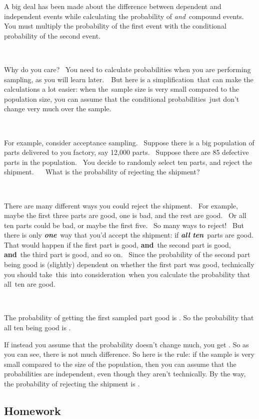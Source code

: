 \documentclass[]{book}
\begin{document}
A big deal has been made about the difference between dependent and
independent events while calculating the probability of \emph{and}~compound
events.~ You must multiply the probability of the first event with the
conditional probability of the second event.

~

Why do you care? ~You need to calculate probabilities when you are
performing sampling, as you will learn later.~~But here is a
simplification~that can make the calculations a lot easier: when
the~sample size is very small compared to the population size, you can
assume that the conditional probabilities~just don't change very much
over the sample.

~

For example, consider acceptance sampling. ~Suppose there is a big
population of parts delivered to you factory, say 12,000 parts. ~Suppose
there are 85 defective parts in the population. ~You decide to randomly
select ten parts, and reject the shipment. ~ ~What is the probability of
rejecting the shipment? ~

~

There are many different ways you could reject the shipment. ~For
example, maybe the first three parts are good, one is bad, and the rest
are good. ~Or all ten parts could be bad, or maybe the first five. ~So
many ways to reject! ~But there is only \textbf{\emph{one}}~way that you'd accept
the shipment: if \textbf{\emph{all} \emph{ten}}~parts are good. That would happen if
the first part is good, \textbf{and}~the second part is good, \textbf{and}~the
third part is good, and so on. ~Since the probability of the second part
being good is (slightly) dependent on whether the first part was good,
technically you should take~this~into consideration~when you calculate
the probability that all~ten are good.

~

The probability of getting the first sampled part good is . So the
probability that all ten being good is .

If instead you assume that the probability doesn't change much, you get
. So as you can see, there is not much difference. So here is the rule:
if the sample is very small compared to the size of the population, then
you can assume that the probabilities are independent, even though they
aren't technically. By the way, the probability of rejecting the
shipment is .

\hypertarget{homework-12}{%
\subsection{Homework}\label{homework-12}}
\end{document}
